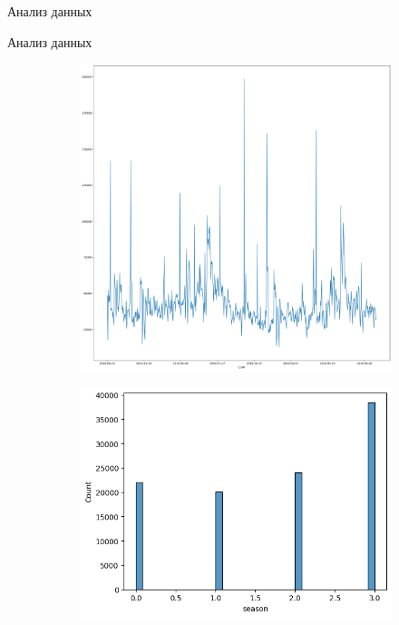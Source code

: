 \documentclass{beamer}
\begin{document}
\begin{frame}{Анализ данных}
\begin{figure}
\begin{subfigure}{.5\textwidth}
      \label{fig:sfig3}
    \end{subfigure}
    \label{fig:fig}
    \end{figure}
\end{frame}

\begin{frame}{Анализ данных}
  \begin{figure}
    \begin{subfigure}{.4\textwidth}
      \centering
      \includegraphics[width=.9\linewidth]{9}
      \label{fig:sfig1}
    \end{subfigure}%
    \begin{subfigure}{.5\textwidth}
      \centering
      \includegraphics[width=.9\linewidth]{10}

\end{subfigure}
\end{figure}
\end{frame}
\end{document}
